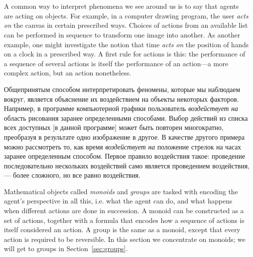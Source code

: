 \documentclass[CT4S-EN-RU]{subfiles}
\begin{document}
\section{}\label{sec:monoids}

\begin{blockENG}
A common way to interpret phenomena we see around us is to say that agents are acting on objects. For example, in a computer drawing program, the user {\em acts on} the canvas in certain prescribed ways. Choices of actions from an available list can be performed in sequence to transform one image into another. As another example, one might investigate the notion that time {\em acts on} the position of hands on a clock in a prescribed way. A first rule for actions is this: the performance of a sequence of several actions is itself the performance of an action—a more complex action, but an action nonetheless.
\end{blockENG}

\begin{blockRUS}
Общепринятым способом интерпретировать феномены, которые мы наблюдаем вокруг, является объяснение их воздействием на объекты некоторых факторов. Например, в программе компьютерной графики пользователь {\em воздействует на} область рисования заранее определенными способами. Выбор действий из списка всех доступных [в данной программе] может быть повторен многократно, преобразуя в результате одно изображение в другое. В качестве другого примера можно рассмотреть то, как время {\em воздействует на} положение стрелок на часах заранее определенным способом. Первое правило воздействия такое: проведение последовательно нескольких воздействий само является проведением воздействия, — более сложного, но все равно воздействия.
\end{blockRUS}

\begin{blockENG}
Mathematical objects called {\em monoids} and {\em groups} are tasked with encoding the agent's perspective in all this, i.e. what the agent can do, and what happens when different actions are done in succession. A monoid can be constructed as a set of actions, together with a formula that encodes how a sequence of actions is itself considered an action. A group is the same as a monoid, except that every action is required to be reversible. In this section we concentrate on monoids; we will get to groups in Section~\ref{sec:groups}.
\end{blockENG}
\end{document}
